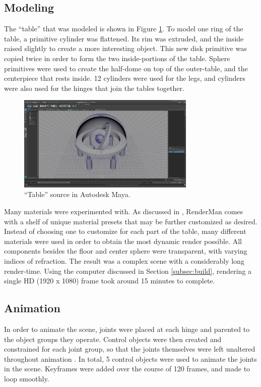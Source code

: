\documentclass[conference]{IEEEtran}
\begin{document}
\subsection{Modeling}
The ``table'' that was modeled is shown in Figure \ref{fig:environment}.
To model one ring of the table, a primitive cylinder was flattened.
Its rim was extruded, and the inside raised slightly to create a more interesting object.
This new disk primitive was copied twice in order to form the two inside-portions of the table.
Sphere primitives were used to create the half-dome on top of the outer-table, and the centerpiece
that rests inside. 12 cylinders were used for the legs, and cylinders were also used
for the hinges that join the tables together.

\begin{figure}[htbp]
\centerline{\includegraphics[width=8.5cm]{project1.png}}
\caption{``Table'' source in Autodesk Maya.}
\label{fig:environment}
\end{figure}

Many materials were experimented with. As discussed in \cite{renderman},
RenderMan comes with a shelf of unique material presets that may be further customized as desired.
Instead of choosing one to customize for each part of the table,
many different materials were used in order to obtain the most dynamic render possible.
All components besides the floor and center sphere were transparent, with varying indices of refraction.
The result was a complex scene with a considerably long render-time.
Using the computer discussed in Section \ref{subsec:build},
rendering a single HD (1920 x 1080) frame took around 15 minutes to complete.

\subsection{Animation}
In order to animate the scene, joints were placed at each hinge and parented to the object groups they operate.
Control objects were then created and constrained for each joint group,
so that the joints themselves were left unaltered throughout animation \cite{rigging}.
In total, 5 control objects were used to animate the joints in the scene.
Keyframes were added over the course of 120 frames, and made to loop smoothly.
\end{document}
